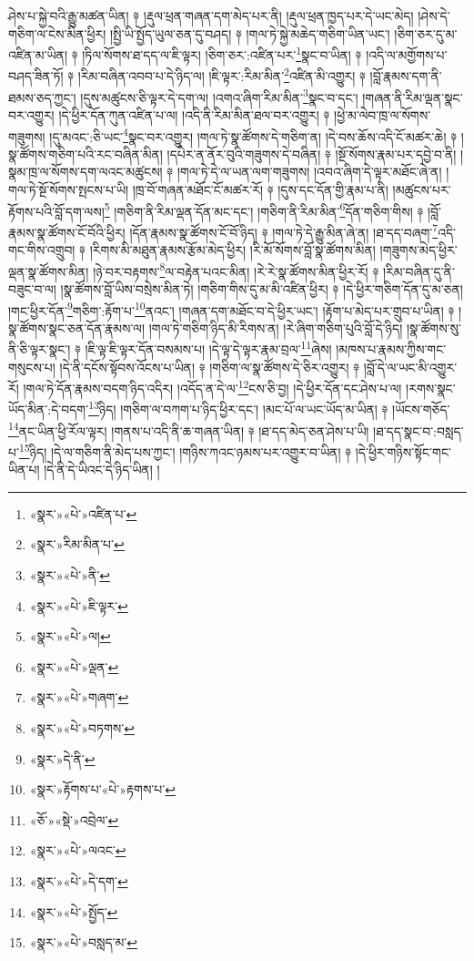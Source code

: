 ཤེས་པ་སྐྱེ་བའི་རྒྱུ་མཚན་ཡིན། ༈ །རྡུལ་ཕྲན་གཞན་དག་མེད་པར་ནི། །རྡུལ་ཕྲན་ཁྱད་པར་དེ་ཡང་མེད། །ཤེས་དེ་གཅིག་ལ་ངེས་མིན་ཕྱིར། །སྤྱི་ཡི་སྤྱོད་ཡུལ་ཅན་དུ་བཤད། ༈ །གལ་ཏེ་སྐྱེ་མཆེད་གཅིག་ཡིན་ཡང་། །ཅིག་ཅར་དུ་མ་འཛིན་མ་ཡིན། ༈ །ཏིལ་སོགས་ཐ་དད་ལ་ཇི་ལྟར། །ཅིག་ཅར་:འཛིན་པར་\footnote{«སྣར་»«པེ་»འཛིན་པ་}སྣང་བ་ཡིན། ༈ །འདི་ལ་མགྱོགས་པ་བཤད་ཟིན་ཏོ། ༈ །རིམ་བཞིན་འབབ་པ་དེ་ཉིད་ལ། །ཇི་ལྟར་:རིམ་མིན་\footnote{«སྣར་»རིམ་མིན་པ་}འཛིན་མི་འགྱུར། ༈ །བློ་རྣམས་དག་ནི་ཐམས་ཅད་ཀྱང་། །དུས་མཚུངས་ཅི་ལྟར་དེ་དག་ལ། །འགའ་ཞིག་རིམ་མིན་\footnote{«སྣར་»«པེ་»ནི་}སྣང་བ་དང་། །གཞན་ནི་རིམ་ལྡན་སྣང་བར་འགྱུར། །དེ་ཕྱིར་དོན་ཀུན་འཛིན་པ་ལ། །འདི་ནི་རིམ་མིན་ཐལ་བར་འགྱུར། ༈ །ཕྱེ་མ་ལེབ་ཁྲ་ལ་སོགས་གཟུགས། །དུ་མའང་:ཅི་ཡང་\footnote{«སྣར་»«པེ་»ཇི་ལྟར་}སྣང་བར་འགྱུར། །གལ་ཏེ་སྣ་ཚོགས་དེ་གཅིག་ན། །དེ་བས་ཆོས་འདི་ངོ་མཚར་ཆེ། ༈ །སྣ་ཚོགས་གཅིག་པའི་རང་བཞིན་མིན། །དཔེར་ན་ནོར་བུའི་གཟུགས་དེ་བཞིན། ༈ །སྔོ་སོགས་རྣམ་པར་དབྱེ་བ་ནི། །སྣམ་ཁྲ་ལ་སོགས་དག་ལའང་མཚུངས། ༈ །གལ་ཏེ་དེ་ལ་ཡན་ལག་གཟུགས། །འབའ་ཞིག་དེ་ལྟར་མཐོང་ཞེ་ན། །གལ་ཏེ་སྔོ་སོགས་སྤངས་པ་ཡི། །ཁྲ་བོ་གཞན་མཐོང་ངོ་མཚར་རོ། ༈ །དུས་དང་དོན་གྱི་རྣམ་པ་ནི། །མཚུངས་པར་རྟོགས་པའི་བློ་དག་ལས།\footnote{«སྣར་»«པེ་»ལ།} །གཅིག་ནི་རིམ་ལྡན་དོན་མང་དང་། །གཅིག་ནི་རིམ་མིན་\footnote{«སྣར་»«པེ་»ལྡན་}དོན་གཅིག་གིས། ༈ །བློ་རྣམས་སྣ་ཚོགས་ངོ་བོའི་ཕྱིར། །དོན་རྣམས་སྣ་ཚོགས་ངོ་བོ་ཉིད། ༈ །གལ་ཏེ་དེ་རྒྱུ་མིན་ཞེ་ན། །ཐ་དད་བཞག་\footnote{«སྣར་»«པེ་»གཞག་}འདི་གང་གིས་འགྲུབ། ༈ །རིགས་མི་མཐུན་རྣམས་རྩོམ་མེད་ཕྱིར། །རི་མོ་སོགས་བློ་སྣ་ཚོགས་མིན། །གཟུགས་མེད་ཕྱིར་ལྡན་སྣ་ཚོགས་མིན། །ཉེ་བར་བརྟགས་\footnote{«སྣར་»«པེ་»བཏགས་}ལ་བརྟེན་པའང་མིན། །རེ་རེ་སྣ་ཚོགས་མིན་ཕྱིར་རོ། ༈ །རིམ་བཞིན་དུ་ནི་བཟུང་བ་ལ། །སྣ་ཚོགས་བློ་ཡིས་བསྲེས་མིན་ཏེ། །གཅིག་གིས་དུ་མ་མི་འཛིན་ཕྱིར། ༈ །དེ་ཕྱིར་གཅིག་དོན་དུ་མ་ཅན། །གང་ཕྱིར་དོན་\footnote{«སྣར་»དེ་ནི་}གཅིག་:རྟོག་པ་\footnote{«སྣར་»རྟོགས་པ་«པེ་»རྟགས་པ་}ནའང་། །གཞན་དག་མཐོང་བ་དེ་ཕྱིར་ཡང་། །རྟོག་པ་མེད་པར་གྲུབ་པ་ཡིན། ༈ །སྣ་ཚོགས་སྣང་ཅན་དོན་རྣམས་ལ། །གལ་ཏེ་གཅིག་ཉིད་མི་རིགས་ན། །རེ་ཞིག་གཅིག་པུའི་བློ་དེ་ཉིད། །སྣ་ཚོགས་སུ་ནི་ཅི་ལྟར་སྣང་། ༈ །ཇི་ལྟ་ཇི་ལྟར་དོན་བསམས་པ། །དེ་ལྟ་དེ་ལྟར་རྣམ་བྲལ་\footnote{«ཅོ་»«སྡེ་»འབྲེལ་}ཞེས། །མཁས་པ་རྣམས་ཀྱིས་གང་གསུངས་པ། །དེ་ནི་དངོས་སྟོབས་འོངས་པ་ཡིན། ༈ །གཅིག་ལ་སྣ་ཚོགས་དེ་ཅིར་འགྱུར། ༈ །བློ་དེ་ལ་ཡང་མི་འགྱུར་རོ། །གལ་ཏེ་དོན་རྣམས་བདག་ཉིད་འདིར། །འདོད་ན་དེ་ལ་\footnote{«སྣར་»«པེ་»ལའང་}ངས་ཅི་བྱ། །དེ་ཕྱིར་དོན་དང་ཤེས་པ་ལ། །རགས་སྣང་ཡོད་མིན་:དེ་བདག་\footnote{«སྣར་»«པེ་»དེ་དག་}ཉིད། །གཅིག་ལ་བཀག་པ་ཉིད་ཕྱིར་དང་། །མང་པོ་ལ་ཡང་ཡོད་མ་ཡིན། ༈ །ཡོངས་གཅོད་\footnote{«སྣར་»«པེ་»སྤྱོད་}ནང་ཡིན་ཕྱི་རོལ་ལྟར། །གནས་པ་འདི་ནི་ཆ་གཞན་ཡིན། ༈ །ཐ་དད་མེད་ཅན་ཤེས་པ་ཡི། །ཐ་དད་སྣང་བ་:བསླད་པ་\footnote{«སྣར་»«པེ་»བསླད་མ་}ཉིད། །དེ་ལ་གཅིག་ནི་མེད་པས་ཀྱང་། །གཉིས་ཀའང་ཉམས་པར་འགྱུར་བ་ཡིན། ༈ །དེ་ཕྱིར་གཉིས་སྟོང་གང་ཡིན་པ། །དེ་ནི་དེ་ཡིའང་དེ་ཉིད་ཡིན། །
